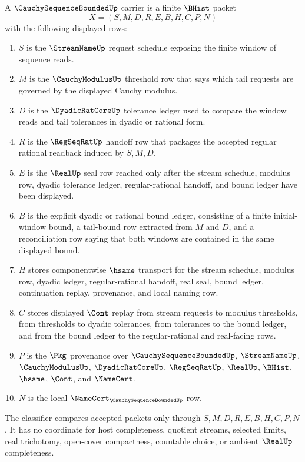 \begin{definition}
\label{def:cauchy-sequence-bounded-carrier}
A $\CauchySequenceBoundedUp$ carrier is a finite $\BHist$ packet
$$
X=(S,M,D,R,E,B,H,C,P,N)
$$
with the following displayed rows:
\begin{enumerate}
\item $S$ is the $\StreamNameUp$ request schedule exposing the finite window of sequence reads.
\item $M$ is the $\CauchyModulusUp$ threshold row that says which tail requests are governed by the displayed Cauchy modulus.
\item $D$ is the $\DyadicRatCoreUp$ tolerance ledger used to compare the window reads and tail tolerances in dyadic or rational form.
\item $R$ is the $\RegSeqRatUp$ handoff row that packages the accepted regular rational readback induced by $S,M,D$.
\item $E$ is the $\RealUp$ seal row reached only after the stream schedule, modulus row, dyadic tolerance ledger, regular-rational handoff, and bound ledger have been displayed.
\item $B$ is the explicit dyadic or rational bound ledger, consisting of a finite initial-window bound, a tail-bound row extracted from $M$ and $D$, and a reconciliation row saying that both windows are contained in the same displayed bound.
\item $H$ stores componentwise $\hsame$ transport for the stream schedule, modulus row, dyadic ledger, regular-rational handoff, real seal, bound ledger, continuation replay, provenance, and local naming row.
\item $C$ stores displayed $\Cont$ replay from stream requests to modulus thresholds, from thresholds to dyadic tolerances, from tolerances to the bound ledger, and from the bound ledger to the regular-rational and real-facing rows.
\item $P$ is the $\Pkg$ provenance over $\CauchySequenceBoundedUp$, $\StreamNameUp$, $\CauchyModulusUp$, $\DyadicRatCoreUp$, $\RegSeqRatUp$, $\RealUp$, $\BHist$, $\hsame$, $\Cont$, and $\NameCert$.
\item $N$ is the local $\NameCert_{\CauchySequenceBoundedUp}$ row.
\end{enumerate}
The classifier compares accepted packets only through $S,M,D,R,E,B,H,C,P,N$. It has no coordinate for host completeness, quotient streams, selected limits, real trichotomy, open-cover compactness, countable choice, or ambient $\RealUp$ completeness.
\end{definition}

